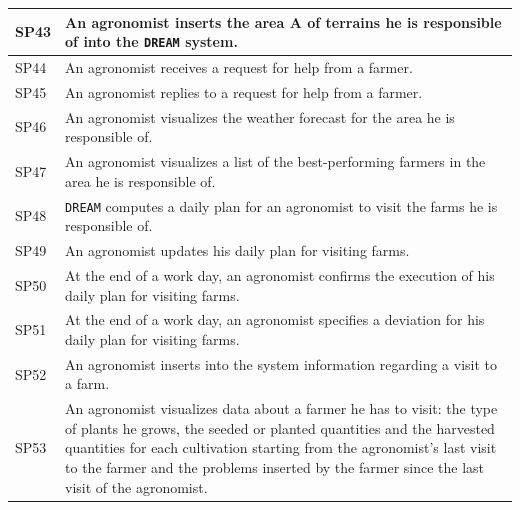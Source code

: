 \documentclass{article}
\begin{document}
\begin{longtable}[c]{|m{0.75cm}|m{11cm}|}
 \hline
 SP43 & An agronomist inserts the area A of terrains he is responsible of into the \verb|DREAM| system.\\
 \hline
 SP44 & An agronomist receives a request for help from a farmer.\\
 \hline
 SP45 & An agronomist replies to a request for help from a farmer.\\
 \hline
 SP46 & An agronomist visualizes the weather forecast for the area he is responsible of.\\
 \hline
 SP47 & An agronomist visualizes a list of the best-performing farmers in the area he is responsible of.\\
 \hline
 SP48 & \verb|DREAM| computes a daily plan  for an agronomist to visit the farms he is responsible of.\\
 \hline
 SP49 & An agronomist updates his daily plan for visiting farms.\\
 \hline
 SP50 & At the end of a work day, an agronomist confirms the execution of his daily plan for visiting farms.\\
 \hline
 SP51 & At the end of a work day, an agronomist specifies a deviation for his daily plan for visiting farms.\\
 \hline
 SP52 & An agronomist inserts into the system information regarding a visit to a farm.\\
 \hline
 SP53 & An agronomist visualizes data about a farmer he has to visit: the type of plants he grows, the seeded or planted quantities and the harvested quantities for each cultivation starting from the agronomist's last visit to the farmer and the problems inserted by the farmer since the last visit of the agronomist.\\
 \hline
 \end{longtable}
\end{document}

